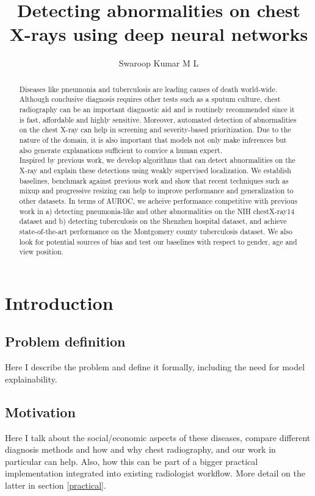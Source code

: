 \documentclass[11pt,twoside,a4paper]{report}
\title{Detecting abnormalities on chest X-rays using deep neural networks}
\author{Swaroop Kumar M L}
\begin{document}
\maketitle
\begin{abstract}
    Diseases like pneumonia and tuberculosis are leading causes of death world-wide.
    Although conclusive diagnosis requires other tests such as a sputum culture,
    chest radiography can be an important diagnostic aid and is routinely recommended
    since it is fast, affordable and highly sensitive. Moreover, automated detection of
    abnormalities on the chest X-ray can help in screening and severity-based prioritization.
    Due to the nature of the domain, it is also important that models not only make inferences
    but also generate explanations sufficient to convice a human expert.\\

    Inspired by previous work, we develop algorithms that can detect abnormalities on the X-ray
    and explain these detections using weakly supervised localization. We establish baselines, 
    benchmark against previous work and show that recent techniques such as mixup and progressive 
    resizing can help to improve performance and generalization to other datasets.
    In terms of AUROC, we acheive performance competitive with previous work in a) detecting pneumonia-like
    and other abnormalities on the NIH chestX-ray14 dataset and b) detecting tuberculosis on the Shenzhen
    hospital dataset, and achieve state-of-the-art performance on the Montgomery county tuberculosis dataset.
    We also look for potential sources of bias and test our baselines with respect to gender, age and 
    view position.
\end{abstract}
\tableofcontents
\chapter{Introduction}
    \section{Problem definition}
    Here I describe the problem and define it formally, including the need for model explainability.
    \section{Motivation}
    Here I talk about the social/economic aspects of these diseases, compare different diagnosis methods
    and how and why chest radiography, and our work in particular can help. Also, how this can be part
    of a bigger practical implementation integrated into existing radiologist workflow. More detail on
    the latter in section \ref{practical}.
\end{document}
